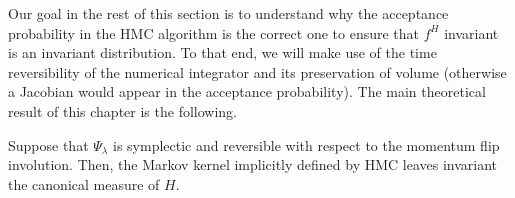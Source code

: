 Our goal in the rest of this section is to understand why the acceptance probability in the HMC
algorithm is the correct one to ensure that $f^H$ invariant is an invariant distribution. To
that end, we will make use of the time reversibility of the numerical integrator and its
preservation of volume (otherwise a Jacobian would appear in the acceptance probability). The
main theoretical result of this chapter is the following.

\begin{theorem}
\label{thm:8.12}
Suppose that $\Psi_\lambda$ is symplectic and reversible with respect to the momentum flip
involution. Then, the Markov kernel implicitly defined by HMC leaves invariant the canonical
measure of $H$.
\end{theorem}

